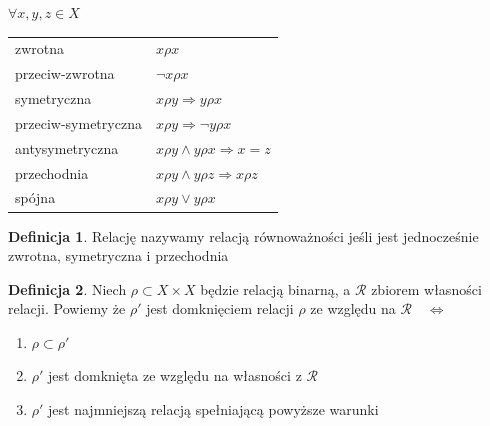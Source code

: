 \documentclass[12pt,a4paper]{article}
\theoremstyle{definition}
\newtheorem{df}{Definicja}
\theoremstyle{remark}
\begin{document}
$\forall x,y,z \in X$
\begin{listliketab}
\begin{tabular}{ll}
	\textbullet  zwrotna & $x \rho x$ \\
	\textbullet  przeciw-zwrotna & $\neg x\rho x$ \\
	\textbullet  symetryczna & $x\rho y \Rightarrow y\rho x$ \\
	\textbullet  przeciw-symetryczna & $x \rho y \Rightarrow \neg y\rho x $ \\
	\textbullet  antysymetryczna & $x\rho y \wedge y\rho x \Rightarrow x= z$ \\
	\textbullet  przechodnia & $x\rho y \wedge y\rho z \Rightarrow x\rho z$ \\
	\textbullet  spójna & $ x\rho y \vee y\rho x $ \\
\end{tabular}
\end{listliketab}

\begin{df}
Relację nazywamy relacją równoważności jeśli jest jednocześnie zwrotna, symetryczna i przechodnia
\end{df}

\begin{df}
Niech $\rho\subset X\times X$ będzie relacją binarną, a $\mathcal{R}$ zbiorem własności relacji. Powiemy że $\rho'$ jest domknięciem relacji $\rho$
ze względu na $\mathcal{R} \quad \Leftrightarrow$
\begin{enumerate}
	\item $\rho \subset \rho'$
	\item $\rho'$ jest domknięta ze względu na własności z $\mathcal{R}$
	\item $\rho'$ jest najmniejszą relacją spełniającą powyższe warunki
\end{enumerate}
\end{df}
\end{document}
